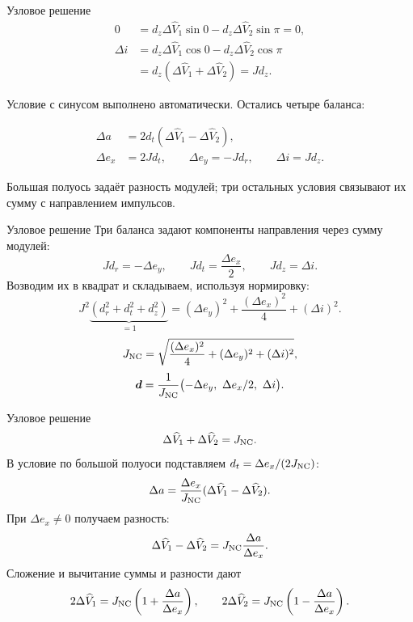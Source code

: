 \documentclass[11pt,aspectratio=169,t]{beamer}
\newcommand{\derivationmathspacing}{%
  \setlength{\abovedisplayskip}{2pt}%
  \setlength{\belowdisplayskip}{3pt}%
  \setlength{\abovedisplayshortskip}{2pt}%
  \setlength{\belowdisplayshortskip}{2pt}%
  \setlength{\jot}{2pt}}
\begin{document}
\begin{frame}{Узловое решение}
\relax
\derivationmathspacing
\[
\begin{aligned}
0
&=d_z\Delta\widehat V_1\sin0
  -d_z\Delta\widehat V_2\sin\pi=0,\\[4pt]
\Delta i
&=d_z\Delta\widehat V_1\cos0
  -d_z\Delta\widehat V_2\cos\pi\\
&=d_z(\Delta\widehat V_1+\Delta\widehat V_2)=Jd_z.
\end{aligned}
\]
{\justifying
Условие с синусом выполнено автоматически. Остались четыре баланса:
\par}
\[
\begin{aligned}
\Delta a&=2d_t(\Delta\widehat V_1-\Delta\widehat V_2),\\
\Delta e_x&=2Jd_t,\qquad
\Delta e_y=-Jd_r,\qquad \Delta i=Jd_z.
\end{aligned}
\]
{\justifying
Большая полуось задаёт разность модулей; три остальных условия
связывают их сумму с направлением импульсов.
\par}
\end{frame}

\begin{frame}{Узловое решение}
\relax
\derivationmathspacing
Три баланса задают компоненты направления через сумму модулей:
\[
Jd_r=-\Delta e_y,\qquad
Jd_t=\frac{\Delta e_x}{2},\qquad
Jd_z=\Delta i.
\]
Возводим их в квадрат и складываем, используя нормировку:
\[
J^2\underbrace{(d_r^2+d_t^2+d_z^2)}_{=1}
=(\Delta e_y)^2+\frac{(\Delta e_x)^2}{4}+(\Delta i)^2.
\]
\[
J_{\rm NC}=\sqrt{\frac{(\Delta e_x)^2}{4}
                         +(\Delta e_y)^2+(\Delta i)^2},
\]
\[
\boldsymbol d=\frac{1}{J_{\rm NC}}
       \bigl(-\Delta e_y,\ \Delta e_x/2,\ \Delta i\bigr).
\]
\end{frame}

\begin{frame}{Узловое решение}
\relax
\derivationmathspacing
\[
\Delta\widehat V_1+\Delta\widehat V_2=J_{\rm NC}.
\]
В условие по большой полуоси подставляем $d_t=\Delta e_x/(2J_{\rm NC})$:
\[
\Delta a=\frac{\Delta e_x}{J_{\rm NC}}
          (\Delta\widehat V_1-\Delta\widehat V_2).
\]
При $\Delta e_x\ne0$ получаем разность:
\[
\Delta\widehat V_1-\Delta\widehat V_2
 =J_{\rm NC}\frac{\Delta a}{\Delta e_x}.
\]
Сложение и вычитание суммы и разности дают
\[
2\Delta\widehat V_1=J_{\rm NC}
  \left(1+\frac{\Delta a}{\Delta e_x}\right),\qquad
2\Delta\widehat V_2=J_{\rm NC}
  \left(1-\frac{\Delta a}{\Delta e_x}\right).
\]
\end{frame}
\end{document}
